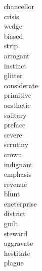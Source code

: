 \documentclass[a4paper, 10pt]{ctexart}
\begin{document}
\begin{multicols*}{2}
\begin{description}
\item[chancellor]

\item[crisis]

\item[wedge]

\item[biased]

\item[strip]

\item[arrogant]

\item[instinct]

\item[glitter]

\item[considerate]

\item[primitive]

\item[aesthetic]

\item[solitary]

\item[preface]

\item[severe]

\item[scrutiny]

\item[crown]

\item[indignant]

\item[emphasis]

\item[revenue]

\item[blunt]

\item[eneterprise]

\item[district]

\item[guilt]

\item[steward]

\item[aggravate]

\item[hestitate]

\item[plague]


\end{description}
\end{multicols*}
\end{document}
